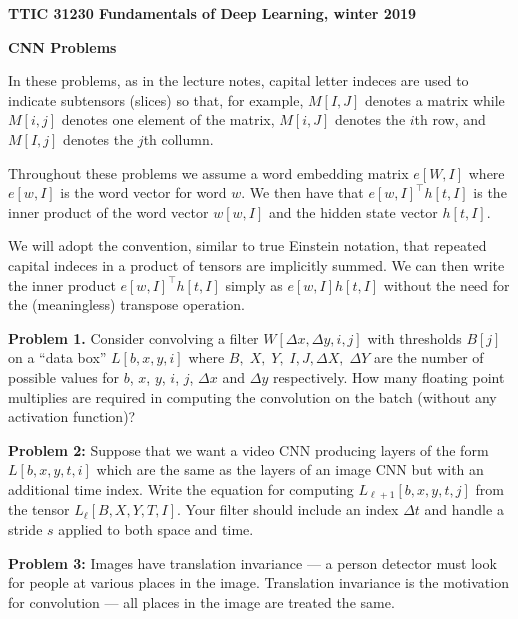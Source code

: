 \documentclass{article}
\newcommand{\solution}[1]{}
\begin{document}
\centerline{\bf TTIC 31230 Fundamentals of Deep Learning, winter 2019}

\medskip
\centerline{\bf CNN Problems}


In these problems, as in the lecture notes, capital letter indeces are used to indicate subtensors (slices) so that, for example,  $M[I,J]$ denotes a matrix
while $M[i,j]$ denotes one element of the matrix, $M[i,J]$ denotes the $i$th row, and $M[I,j]$ denotes the $j$th collumn.

\medskip
Throughout these problems we assume a word embedding matrix $e[W,I]$ where $e[w,I]$ is the word vector for word $w$. We then have that $e[w,I]^\top h[t,I]$
is the inner product of the word vector $w[w,I]$ and the hidden state vector $h[t,I]$.

\medskip
We will adopt the convention, similar to true Einstein notation, that repeated capital indeces in a product of tensors are implicitly summed.  We can then write
the inner product $e[w,I]^\top h[t,I]$ simply as $e[w,I]h[t,I]$ without the need for the (meaningless) transpose operation.

\bigskip
{\bf Problem 1.}  Consider convolving a filter $W[\Delta x, \Delta y, i,j]$  with thresholds $B[j]$ on a ``data box'' $L[b,x,y,i]$ where $B,\;X,\;Y,\;I, J,\Delta X,\;\Delta Y$
are the number of possible values for $b$, $x$, $y$, $i$, $j$, $\Delta x$ and $\Delta y$ respectively.
How many floating point multiplies are required
in computing the convolution on the batch (without any activation function)?

\solution{$$BXY\;\Delta X\;\Delta Y \;IJ$$}

\bigskip
{\bf Problem 2:} Suppose that we want a video CNN producing layers of the form $L[b,x,y,t,i]$ which are the same as the layers of an image CNN but with an additional time index.
Write the equation for computing $L_{\ell+1}[b,x,y,t,j]$ from the tensor $L_\ell[B,X,Y,T,I]$.  Your filter should include an index $\Delta t$ and handle a stride $s$ applied
to both space and time.

\solution{
  $$L_{\ell + 1}[b,x,y,t,j] = \sum_{\Delta x, \Delta y, \Delta t, i} W[\Delta x, \Delta y, \Delta t, i, j] L_\ell[b, sx+ \Delta x, sy + \Delta y, st + \Delta t, i]$$
  }

\bigskip
{\bf Problem 3:} Images have translation invariance --- a person detector must look for people at various places in the image.  Translation invariance is the motivation for
convolution --- all places in the image are treated the same.
\end{document}
